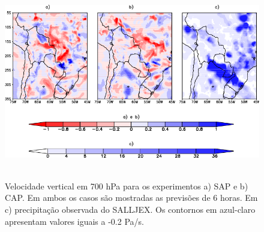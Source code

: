 \begin{figure}
\centering
\includegraphics[height=8.5cm]{./figs/vel_vert_omega_salljex.png}
\caption{Velocidade vertical em 700 hPa para os experimentos a) SAP e b) CAP. Em ambos os casos são mostradas as previsões de 6 horas. Em c) precipitação observada do SALLJEX. Os contornos em azul-claro apresentam valores iguais a -0.2 Pa/s.}
\label{fig67}
\end{figure}
